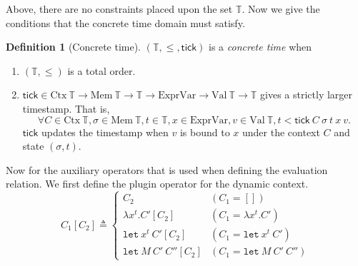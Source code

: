 \documentclass{article}
\theoremstyle{definition}
\newtheorem{definition}{Definition}[section]
\newcommand*{\ExprVar}{\text{ExprVar}}
\newcommand*{\Time}{\mathbb{T}}
\newcommand*{\Ctx}[1]{\text{Ctx}\:{#1}}
\newcommand*{\Value}[1]{\text{Val}\:{#1}}
\newcommand*{\Mem}[1]{\text{Mem}\:{#1}}
\newcommand*{\tick}{\mathsf{tick}}
\begin{document}
Above, there are no constraints placed upon the set $\Time$.
Now we give the conditions that the concrete time domain must satisfy.

\begin{definition}[Concrete time]
  $(\Time, \le, \tick)$ is a \emph{concrete time} when
  \begin{enumerate}
    \item $(\Time, \le)$ is a total order.
    \item $\tick\in\Ctx{\Time}\rightarrow\Mem{\Time}\rightarrow\Time\rightarrow\ExprVar\rightarrow\Value{\Time}\rightarrow\Time$ gives a strictly larger timestamp. That is,
          \[\forall C\in\Ctx{\Time}, \sigma\in\Mem{\Time},t\in\Time,x\in\ExprVar,v\in\Value{\Time}, t < \tick\:C\:\sigma\:t\:x\:v.\]
          $\tick$ updates the timestamp when $v$ is bound to $x$ under the context $C$ and state $(\sigma, t)$.
  \end{enumerate}
\end{definition}

Now for the auxiliary operators that is used when defining the evaluation relation.
We first define the plugin operator for the dynamic context.
\[
  C_{1}[C_{2}]\triangleq
  \begin{cases}
    C_{2}                           & (C_{1}=[])                       \\
    \lambda x^{t}.C'[C_{2}]         & (C_{1}=\lambda x^{t}.C')         \\
    \mathtt{let}\:x^{t}\:C'[C_{2}]  & (C_{1}=\mathtt{let}\:x^{t}\:C')  \\
    \mathtt{let}\:M\:C'\:C''[C_{2}] & (C_{1}=\mathtt{let}\:M\:C'\:C'')
  \end{cases}
\]
\end{document}
